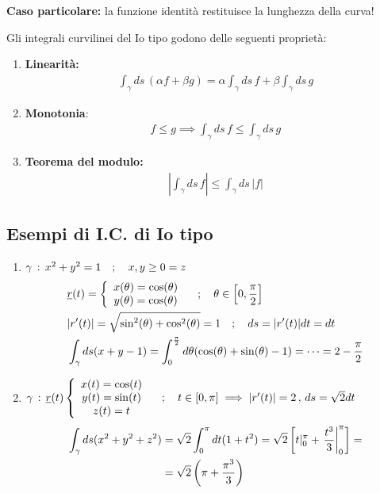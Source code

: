 \textbf{Caso particolare:} la funzione identità restituisce la lunghezza della curva!

Gli integrali curvilinei del Io tipo godono delle seguenti proprietà:

\begin{enumerate}
	\item \textbf{Linearità:
	\begin{align}
	\int_{\gamma} ds \, (\alpha f + \beta g)= \alpha\int_{\gamma} ds \, f + \beta \int_{\gamma} ds \, g
	\end{align}}

	\item \textbf{Monotonia}:
	\begin{align}
	f\leq g \implies \int_{\gamma} ds \, f \leq \int_{\gamma} ds \, g
	\end{align}
	
	\item \textbf{Teorema del modulo:}
	\begin{align}
	\left| \int_{\gamma} ds \, f \right| \leq \int_{\gamma} ds \, |f|
	\end{align}
\end{enumerate}

\newpage

\subsection{Esempi di I.C. di Io tipo}

\begin{enumerate}
	\item $\gamma \, : \, x^2 +y^2 =1 \quad ; \quad x,y \geq 0 = z$ 
	\begin{align}
	{}&\underline{r}(t)= \left\{\begin{array}{cc} x(\theta)= \cos(\theta) \\ y(\theta) = \cos(\theta) \end{array}\right.\quad ; \quad \theta \in \left[0,\frac{\pi}{2}\right] \\
	&|r'(t)|= \sqrt{\sin^2(\theta) + \cos^2(\theta)}=1 \quad ; \quad ds = |r'(t)|dt=dt\\
	&\int_{\gamma} ds (x + y -1) = \int_{0}^{\frac{\pi}{2}}d\theta ( \cos(\theta) + \sin(\theta) -1)= \dots = 2 - \frac{\pi}{2}
	\end{align}

	\item $\gamma \, : \, \underline{r}(t) \left\{\begin{array}{cc} x(t)= \cos(t) \\ y(t)= \sin(t) \\ z(t)=t \end{array}\right. \quad ; \quad t \in [0,\pi] \implies |r'(t)|= 2 \, , \, ds = \sqrt{2}dt$
	\begin{align}
	\int_{\gamma} ds (x^2 + y^2 + z^2) {}&= \sqrt{2}\int_{0}^{\pi} dt (1 + t^2) = \sqrt{2} \left[t|_0^\pi + \left.\frac{t^3}{3}\right|_0^\pi \right] = \nonumber \\ &=\sqrt{2}\left(\pi + \frac{\pi^3}{3}\right)
	\end{align}
	
\end{enumerate}

